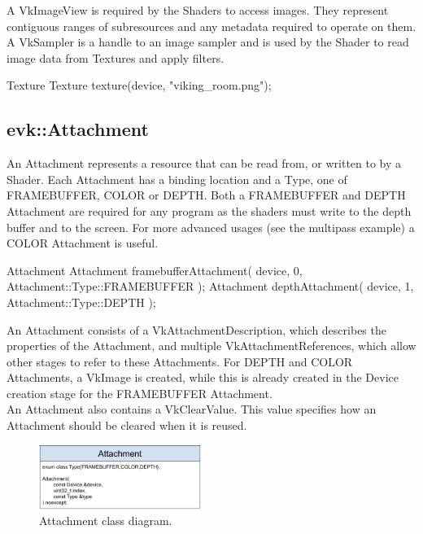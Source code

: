 \documentclass[12pt]{report}
\newcommand{\imagewidth}{0.47\textwidth}
\theoremstyle{definition}
\begin{document}
        A VkImageView is required by the Shaders to access images. They
        represent contiguous ranges of subresources and any metadata
        required to operate on them. A VkSampler is a handle to an image
        sampler and is used by the Shader to read image data from Textures
        and apply filters.

        \begin{usage}{Texture}
  Texture texture(device, "viking_room.png");
        \end{usage}

      \subsection{evk::Attachment}

        An Attachment represents a resource that can be read from, or written
        to by a Shader. Each Attachment has a binding location and a Type, one
        of FRAMEBUFFER, COLOR or DEPTH. Both a FRAMEBUFFER and DEPTH Attachment
        are required for any program as the shaders must write to the depth
        buffer and to the screen. For more advanced usages (see the multipass
        example) a COLOR Attachment is useful.

        \begin{usage}{Attachment}
  Attachment framebufferAttachment(
    device, 0, Attachment::Type::FRAMEBUFFER
  );
  Attachment depthAttachment(
    device, 1, Attachment::Type::DEPTH
  );
        \end{usage}

        An Attachment consists of a VkAttachmentDescription, which describes
        the properties of the Attachment, and multiple VkAttachmentReferences,
        which allow other stages to refer to these Attachments. For DEPTH and
        COLOR Attachments, a VkImage is created, while this is already created
        in the Device creation stage for the FRAMEBUFFER Attachment. \\

        An Attachment also contains a VkClearValue. This value specifies how an
        Attachment should be cleared when it is reused. \\

        \begin{figure}[h]
          \centering
          \includegraphics[width=\imagewidth]{images/class_attachment.png}
          \caption{Attachment class diagram.}
          \label{fig:class_attachment}  
        \end{figure}
\end{document}
